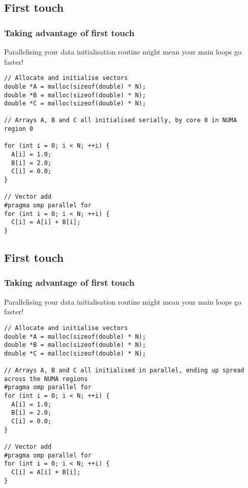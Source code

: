 \documentclass{beamer}
\begin{document}
\subsection{First touch}
\begin{frame}[fragile]
\frametitle{Taking advantage of first touch}
Parallelising your data initialisation routine might mean your main loops go faster!


\begin{verbatim}
// Allocate and initialise vectors
double *A = malloc(sizeof(double) * N);
double *B = malloc(sizeof(double) * N);
double *C = malloc(sizeof(double) * N);

// Arrays A, B and C all initialised serially, by core 0 in NUMA region 0

for (int i = 0; i < N; ++i) {
  A[i] = 1.0;
  B[i] = 2.0;
  C[i] = 0.0;
}

// Vector add
#pragma omp parallel for
for (int i = 0; i < N; ++i) {
  C[i] = A[i] + B[i];
}
\end{verbatim}

\end{frame}

\subsection{First touch}
\begin{frame}[fragile]
\frametitle{Taking advantage of first touch}
Parallelising your data initialisation routine might mean your main loops go faster!


\begin{verbatim}
// Allocate and initialise vectors
double *A = malloc(sizeof(double) * N);
double *B = malloc(sizeof(double) * N);
double *C = malloc(sizeof(double) * N);

// Arrays A, B and C all initialised in parallel, ending up spread across the NUMA regions
#pragma omp parallel for
for (int i = 0; i < N; ++i) {
  A[i] = 1.0;
  B[i] = 2.0;
  C[i] = 0.0;
}

// Vector add
#pragma omp parallel for
for (int i = 0; i < N; ++i) {
  C[i] = A[i] + B[i];
}
\end{verbatim}

\end{frame}
\end{document}
